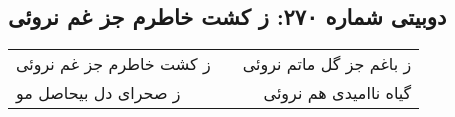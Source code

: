 \begin{center}
\section*{دوبیتی شماره ۲۷۰: ز کشت خاطرم جز غم نروئی}
\label{sec:270}
\begin{longtable}{l p{0.5cm} r}
ز کشت خاطرم جز غم نروئی
&&
ز باغم جز گل ماتم نروئی
\\
ز صحرای دل بیحاصل مو
&&
گیاه ناامیدی هم نروئی
\\
\end{longtable}
\end{center}
